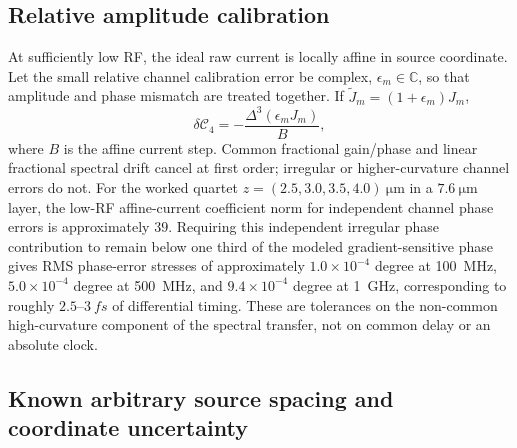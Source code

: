 \documentclass[11pt]{article}
\newcommand{\Cfour}{\mathcal{C}_4}
\begin{document}
\subsection{Relative amplitude calibration}

At sufficiently low RF, the ideal raw current is locally affine in source coordinate. Let the small relative channel calibration error be complex, $\epsilon_m\in\mathbb C$, so that amplitude and phase mismatch are treated together. If $\widetilde J_m=(1+\epsilon_m)J_m$,
\begin{equation}
\boxed{
\delta\Cfour=-\frac{\Delta^3(\epsilon_mJ_m)}{B},}
\label{eq:ampcal}
\end{equation}
where $B$ is the affine current step. Common fractional gain/phase and linear fractional spectral drift cancel at first order; irregular or higher-curvature channel errors do not. For the worked quartet $z=(2.5,3.0,3.5,4.0)~\si{\micro\meter}$ in a $7.6~\si{\micro\meter}$ layer, the low-RF affine-current coefficient norm for independent channel phase errors is approximately $39$. Requiring this independent irregular phase contribution to remain below one third of the modeled gradient-sensitive phase gives RMS phase-error stresses of approximately $1.0\times10^{-4}$ degree at \SI{100}{MHz}, $5.0\times10^{-4}$ degree at \SI{500}{MHz}, and $9.4\times10^{-4}$ degree at \SI{1}{GHz}, corresponding to roughly $2.5$--$3~\si{fs}$ of differential timing. These are tolerances on the non-common high-curvature component of the spectral transfer, not on common delay or an absolute clock.

\subsection{Known arbitrary source spacing and coordinate uncertainty}
\end{document}
